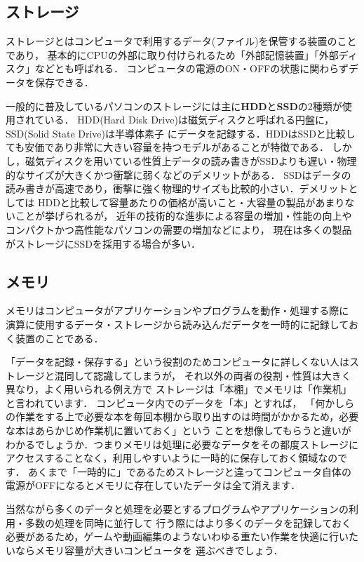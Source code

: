 \documentclass[autodetect-engine,dvi=dvipdfmx,ja=standard,a4j]{bxjsarticle}
\begin{document}
\subsection{ストレージ}
ストレージとはコンピュータで利用するデータ(ファイル)を保管する装置のことであり，
基本的にCPUの外部に取り付けられるため「外部記憶装置」「外部ディスク」などとも呼ばれる．
コンピュータの電源のON・OFFの状態に関わらずデータを保存できる．

一般的に普及しているパソコンのストレージには主に\textbf{HDD}と\textbf{SSD}の2種類が使用されている．
HDD(Hard Disk Drive)は磁気ディスクと呼ばれる円盤に，SSD(Solid State Drive)は半導体素子
にデータを記録する．HDDはSSDと比較しても安価であり非常に大きい容量を持つモデルがあることが特徴である．
しかし，磁気ディスクを用いている性質上データの読み書きがSSDよりも遅い・物理的なサイズが大きくかつ衝撃に弱くなどのデメリットがある．
SSDはデータの読み書きが高速であり，衝撃に強く物理的サイズも比較的小さい．デメリットとしては
HDDと比較して容量あたりの価格が高いこと・大容量の製品があまりないことが挙げられるが，
近年の技術的な進歩による容量の増加・性能の向上やコンパクトかつ高性能なパソコンの需要の増加などにより，
現在は多くの製品がストレージにSSDを採用する場合が多い．

\subsection{メモリ}
メモリはコンピュータがアプリケーションやプログラムを動作・処理する際に
演算に使用するデータ・ストレージから読み込んだデータを一時的に記録しておく装置のことである．

「データを記録・保存する」という役割のためコンピュータに詳しくない人はストレージと混同して認識してしまうが，
それ以外の両者の役割・性質は大きく異なり，よく用いられる例え方で
ストレージは「本棚」でメモリは「作業机」と言われています．
コンピュータ内でのデータを「本」とすれば，
「何かしらの作業をする上で必要な本を毎回本棚から取り出すのは時間がかかるため，必要な本はあらかじめ作業机に置いておく」という
ことを想像してもらうと違いがわかるでしょうか．つまりメモリは処理に必要なデータをその都度ストレージにアクセスすることなく，利用しやすいように一時的に保存しておく領域なのです．
あくまで「一時的に」であるためストレージと違ってコンピュータ自体の電源がOFFになるとメモリに存在していたデータは全て消えます．

当然ながら多くのデータと処理を必要とするプログラムやアプリケーションの利用・多数の処理を同時に並行して
行う際にはより多くのデータを記録しておく必要があるため，ゲームや動画編集のようないわゆる重たい作業を快適に行いたいならメモリ容量が大きいコンピュータを
選ぶべきでしょう．
\end{document}
